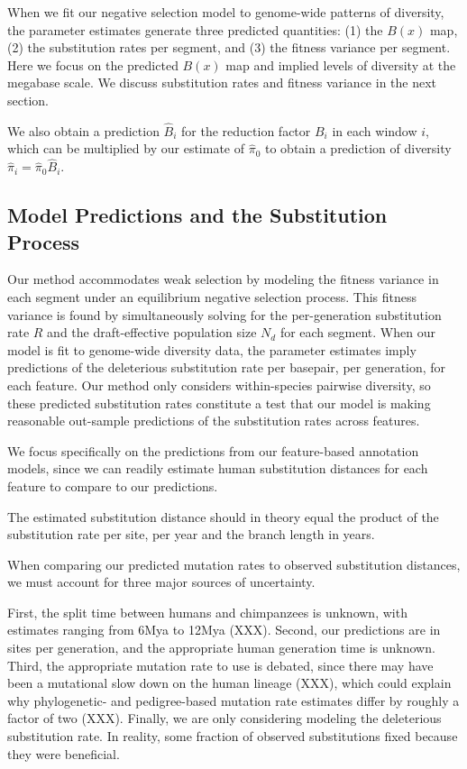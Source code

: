 \documentclass[11pt]{article}
\begin{document}
When we fit our negative selection model to genome-wide patterns of diversity,
the parameter estimates generate three predicted quantities: (1) the $B(x)$
map, (2) the substitution rates per segment, and (3) the fitness variance per
segment. Here we focus on the predicted $B(x)$ map and implied levels of
diversity at the megabase scale. We discuss substitution rates and fitness
variance in the next section.

We also obtain a prediction $\widehat{B}_i$ for the reduction factor $B_i$ in
each window $i$, which can be multiplied by our estimate of $\widehat{\pi}_0$
to obtain a prediction of diversity $\widehat{\pi}_i = \widehat{\pi}_0
\widehat{B}_i$. 

\subsection*{Model Predictions and the Substitution Process}

Our method accommodates weak selection by modeling the fitness variance in each
segment under an equilibrium negative selection process. This fitness variance
is found by simultaneously solving for the per-generation substitution rate $R$
and the draft-effective population size $N_d$ for each segment. When our model
is fit to genome-wide diversity data, the parameter estimates imply predictions
of the deleterious substitution rate per basepair, per generation, for each
feature. Our method only considers within-species pairwise diversity, so these
predicted substitution rates constitute a test that our model is making
reasonable out-sample predictions of the substitution rates across features.

We focus specifically on the predictions from our feature-based annotation
models, since we can readily estimate human substitution distances for each
feature to compare to our predictions.

The estimated substitution distance should in theory equal the product of the
substitution rate per site, per year and the branch length in years.

When comparing our predicted mutation rates to observed substitution distances,
we must account for three major sources of uncertainty.

First, the split time between humans and chimpanzees is unknown, with estimates
ranging from 6Mya to 12Mya (XXX). Second, our predictions are in sites per
generation, and the appropriate human generation time is unknown. Third, the
appropriate mutation rate to use is debated, since there may have been a
mutational slow down on the human lineage (XXX), which could explain why
phylogenetic- and pedigree-based mutation rate estimates differ by roughly a
factor of two (XXX). Finally, we are only considering modeling the deleterious
substitution rate. In reality, some fraction of observed substitutions fixed
because they were beneficial. 
\end{document}
